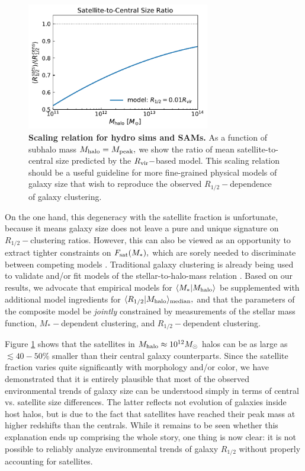 \documentclass[usenatbib,usegraphicx,letterpaper]{mn2e}
\newcommand{\rhalf}{R_{1/2}}
\newcommand{\mstar}{M_{\ast}}
\newcommand{\mpeak}{M_{\rm peak}}
\newcommand{\mhalo}{M_{\rm halo}}
\newcommand{\rvir}{R_{\rm vir}}
\newcommand{\mean}[2]{\langle{#1}\vert{#2}\rangle}
\newcommand{\median}[2]{\langle{#1}\vert{#2}\rangle_{\rm median}}
\newcommand{\msun}{M_\odot}
\begin{document}
\begin{figure}
\centering
\includegraphics[width=8cm]{FIGS/cen_sat_size_ratios.pdf}
\caption{
{\bf Scaling relation for hydro sims and SAMs.}
As a function of subhalo mass $\mhalo=\mpeak,$ we show the ratio of mean satellite-to-central size predicted by the $\rvir-$based model. This scaling relation should be a useful guideline for more fine-grained physical models of galaxy size that wish to reproduce the observed $\rhalf-$dependence of galaxy clustering.
}
\label{fig:censatsizeratios}
\end{figure}

On the one hand, this degeneracy with the satellite fraction is unfortunate, because it means galaxy size does not leave a pure and unique signature on $\rhalf-$clustering ratios. However, this can also be viewed as an opportunity to extract tighter constraints on $F_{\rm sat}(\mstar),$ which are sorely needed to discriminate between competing models \citep{watson_conroy13}. Traditional galaxy clustering is already being used to validate and/or fit models of the stellar-to-halo-mass relation \citep[e.g.,][]{leauthaud_etal11,moster_etal13,behroozi13_smhm,lehmann_etal15}. Based on our results, we advocate that empirical models for $\mean{\mstar}{\mhalo}$ be supplemented with additional model ingredients for $\median{\rhalf}{\mhalo},$ and that the parameters of the composite model be {\em jointly} constrained by measurements of the stellar mass function, $\mstar-$dependent clustering, and $\rhalf-$dependent clustering.

Figure \ref{fig:censatsizeratios} shows that the satellites in $\mhalo\approx10^{12}\msun$ halos can be as large as $\lesssim40-50\%$ smaller than their central galaxy counterparts. Since the satellite fraction varies quite significantly with morphology and/or color, we have demonstrated that it is entirely plausible that most of the observed environmental trends of galaxy size can be understood simply in terms of central vs. satellite size differences. The latter reflects not evolution of galaxies inside host halos, but is due to the fact that satellites have reached their peak mass at higher redshifts than the centrals. While it remains to be seen whether this explanation ends up comprising the whole story, one thing is now clear: it is not possible to reliably analyze environmental trends of galaxy $\rhalf$ without properly accounting for satellites. 
\end{document}
